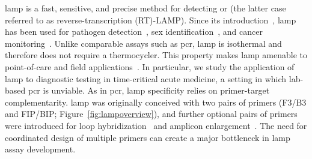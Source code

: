 \documentclass[../thesis.tex]{subfiles}
\begin{document}
\Gls{lamp} is a fast, sensitive, and precise method for detecting  or  (the latter case referred to as reverse-transcription (RT)-LAMP). Since its introduction~\citep{notomi_loop-mediated_2000}, \gls{lamp} has been used for pathogen detection~\citep{mekata_real-time_2009, cao_development_2017, thiessen_development_2018}, sex identification~\citep{hirayama_embryo_2013, almasi_loop_2017, centeno-cuadros_validation_2018}, and cancer monitoring~\citep{li_loop-mediated_2016, horiuchi_novel_2020, kalofonou_novel_2020}. 
Unlike comparable assays such as \gls{pcr}, \gls{lamp} is isothermal and therefore does not require a thermocycler. This property makes \gls{lamp} amenable to point-of-care and field applications~\citep{fu_applications_2011}. In particular, we study the application of \gls{lamp} to diagnostic testing in time-critical acute medicine, a setting in which lab-based \gls{pcr} is unviable.
As in \gls{pcr}, \gls{lamp} specificity relies on primer-target complementarity. \Gls{lamp} was originally conceived with two pairs of primers (F3/B3 and FIP/BIP; Figure~\ref{fig:lampoverview}), and further optional pairs of primers were introduced for loop hybridization~\citep{nagamine_accelerated_2002} and amplicon enlargement~\citep{gandelman_loop-mediated_2011}. The need for coordinated design of multiple primers can create a major bottleneck in \gls{lamp} assay development. 
\end{document}

